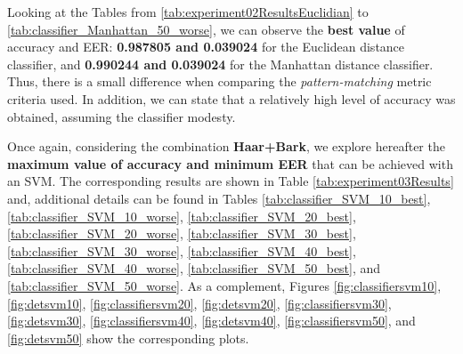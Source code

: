 		\par Looking at the Tables from \ref{tab:experiment02ResultsEuclidian} to \ref{tab:classifier_Manhattan_50_worse}, we can observe the \textbf{best value} of accuracy and EER: \textbf{0.987805 and 0.039024} for the Euclidean distance classifier, and \textbf{0.990244 and 0.039024} for the Manhattan distance classifier. Thus, there is a small difference when comparing the \textit{pattern-matching} metric criteria used. In addition, we can state that a relatively high level of accuracy was obtained, assuming the classifier modesty.
		\\
		\par Once again, considering the combination \textbf{Haar+Bark}, we explore hereafter the \textbf{maximum value of accuracy and minimum EER} that can be achieved with an SVM. The corresponding results are shown in Table \ref{tab:experiment03Results} and, additional details can be found in Tables \ref{tab:classifier_SVM_10_best}, \ref{tab:classifier_SVM_10_worse}, \ref{tab:classifier_SVM_20_best}, \ref{tab:classifier_SVM_20_worse}, \ref{tab:classifier_SVM_30_best}, \ref{tab:classifier_SVM_30_worse}, \ref{tab:classifier_SVM_40_best}, \ref{tab:classifier_SVM_40_worse}, \ref{tab:classifier_SVM_50_best}, and \ref{tab:classifier_SVM_50_worse}. As a complement, Figures \ref{fig:classifiersvm10}, \ref{fig:detsvm10}, \ref{fig:classifiersvm20}, \ref{fig:detsvm20}, \ref{fig:classifiersvm30}, \ref{fig:detsvm30}, \ref{fig:classifiersvm40}, \ref{fig:detsvm40}, \ref{fig:classifiersvm50}, and \ref{fig:detsvm50} show the corresponding plots.\\
		
		
		
		
		
		
		
		\FloatBarrier

